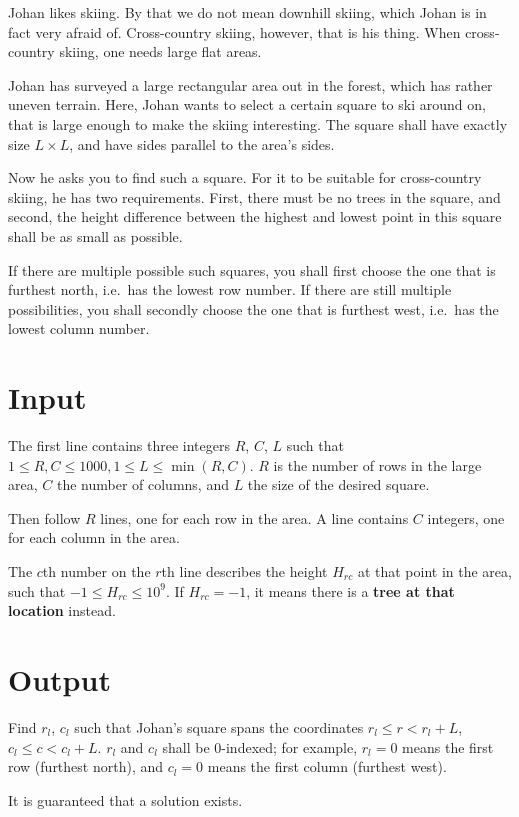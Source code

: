 Johan likes skiing.
By that we do not mean downhill skiing, which Johan is in fact very afraid of.
Cross-country skiing, however, that is his thing.
When cross-country skiing, one needs large flat areas.

Johan has surveyed a large rectangular area out in the forest, which has rather uneven terrain.
Here, Johan wants to select a certain square to ski around on, that is large enough to make the skiing interesting.
The square shall have exactly size $L \times L$, and have sides parallel to the area's sides.

Now he asks you to find such a square.
For it to be suitable for cross-country skiing, he has two requirements.
First, there must be no trees in the square, and second, the height difference between the highest and lowest point in this square shall be as small as possible.

If there are multiple possible such squares, you shall first choose the one that is furthest north, i.e.\ has the lowest row number. If there are still multiple possibilities,
you shall secondly choose the one that is furthest west, i.e.\ has the lowest column number.

\section*{Input}
The first line contains three integers $R$, $C$, $L$ such that $1\leq R,C \leq 1000, 1 \leq L \leq \min(R,C)$.
$R$ is the number of rows in the large area, $C$ the number of columns, and $L$ the size of the desired square.

Then follow $R$ lines, one for each row in the area. A line contains $C$ integers, one for each column in the area.

The $c$th number on the $r$th line describes the height $H_{rc}$ at that point in the area, such that $-1 \leq H_{rc} \leq 10^9$.
If $H_{rc} = -1$, it means there is a \textbf{tree at that location} instead.

\section*{Output}
Find $r_l$, $c_l$ such that Johan's square spans the coordinates $r_l \leq r <r_l + L$, $c_l \leq c < c_l + L$. $r_l$ and $c_l$ shall be 0-indexed; for example, $r_l = 0$ means the first row (furthest north), and $c_l = 0$ means the first column (furthest west).

It is guaranteed that a solution exists.

